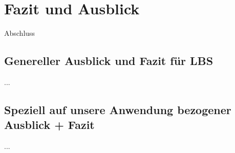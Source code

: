 \section{Fazit und Ausblick}
Abschluss
	\subsection{Genereller Ausblick und Fazit für LBS}
...
	\subsection{Speziell auf unsere Anwendung bezogener Ausblick + Fazit}
...